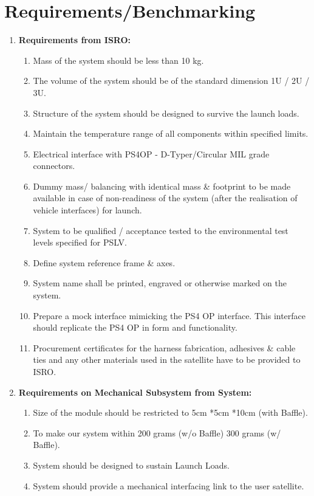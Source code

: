 \documentclass[../../main.tex]{subfiles}
\begin{document}
\section{Requirements/Benchmarking}
\begin{enumerate}
    \item \textbf{Requirements from ISRO:}
    \begin{enumerate}
        \item Mass of the system should be less than 10 kg.
         \item The volume of the system should be of the standard dimension 1U / 2U / 3U.
         \item Structure of the system should be designed to survive the launch loads.
         \item Maintain the temperature range of all components within specified limits.
         \item Electrical interface with PS4OP - D-Typer/Circular MIL grade connectors. 
         \item Dummy mass/ balancing with identical mass \& footprint to be made available in case of non-readiness of the system (after the realisation of vehicle interfaces) for launch.
        \item System to be qualified / acceptance tested to the environmental test levels specified for PSLV.
        \item Define system reference frame \& axes.
        \item System name shall be printed, engraved or otherwise marked on the system.
        \item  Prepare a mock interface mimicking the PS4 OP interface. This interface should replicate the PS4 OP in form and functionality.
        \item Procurement certificates for the harness fabrication, adhesives \& cable ties and any other materials used in the satellite have to be     provided to ISRO.
    \end{enumerate}
    \item \textbf{Requirements on Mechanical Subsystem from System:}
    \begin{enumerate}
        \item Size of the module should be restricted to 5cm *5cm *10cm (with Baffle).
        \item To make our system within 200 grams (w/o Baffle) 300 grams (w/ Baffle).
        \item System should be designed to sustain Launch Loads.
        \item System should provide a mechanical interfacing link to the user satellite.

\end{enumerate}
\end{enumerate}
\end{document}
